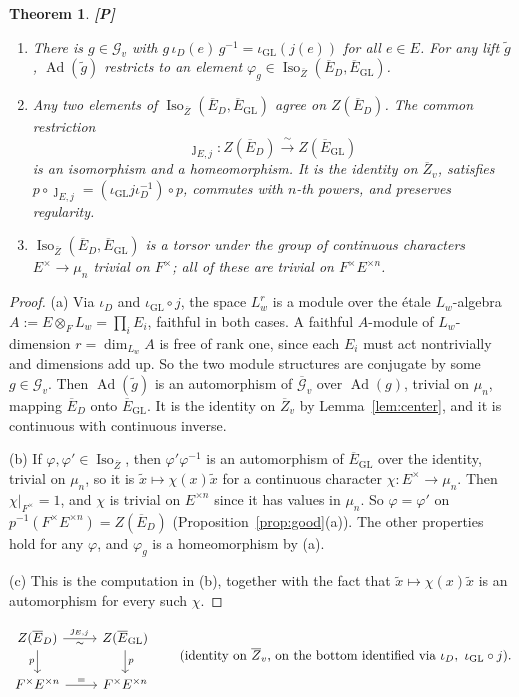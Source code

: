 \documentclass[12pt]{article}
\newcommand{\ov}[1]{\overline{#1}}
\newcommand{\Ad}{\operatorname{Ad}}
\newcommand{\Iso}{\operatorname{Iso}}
\newcommand{\GL}{\mathrm{GL}}
\newcommand{\Zb}{\ov{Z}}
\newcommand{\Eb}{\ov{E}}
\newcommand{\cG}{\mathcal{G}}
\newcommand{\cGb}{\ov{\mathcal{G}}}
\newcommand{\iD}{\iota_D}
\newcommand{\iG}{\iota_{\GL}}
\newcommand{\jj}{\jmath}
\newcommand{\Pv}{\textbf{[P]}}
\theoremstyle{plain}
\newtheorem{theorem}{Theorem}[section]
\theoremstyle{definition}
\begin{document}
\begin{theorem}\label{thm:ident}\Pv
\begin{enumerate}[label=(\alph*)]
\item There is $g\in\cG_v$ with $g\,\iD(e)\,g^{-1}=\iG(j(e))$ for all $e\in E$. For any lift $\tilde g$, $\Ad(\tilde g)$ restricts to an element $\varphi_g\in\Iso_{\Zb}(\Eb_D,\Eb_{\GL})$.
\item Any two elements of $\Iso_{\Zb}(\Eb_D,\Eb_{\GL})$ agree on $Z(\Eb_D)$. The common restriction
\[ \jj_{E,j}:Z(\Eb_D)\xrightarrow{\ \sim\ }Z(\Eb_{\GL}) \]
is an isomorphism and a homeomorphism. It is the identity on $\Zb_v$, satisfies $p\circ\jj_{E,j}=(\iG j\iD^{-1})\circ p$, commutes with $n$-th powers, and preserves regularity.
\item $\Iso_{\Zb}(\Eb_D,\Eb_{\GL})$ is a torsor under the group of continuous characters $E^\times\to\mu_n$ trivial on $F^\times$; all of these are trivial on $F^\times E^{\times n}$.
\end{enumerate}
\end{theorem}

\begin{proof}
(a) Via $\iD$ and $\iG\circ j$, the space $L_w^r$ is a module over the \'etale $L_w$-algebra $A:=E\otimes_FL_w=\prod_iE_i$, faithful in both cases. A faithful $A$-module of $L_w$-dimension $r=\dim_{L_w}A$ is free of rank one, since each $E_i$ must act nontrivially and dimensions add up. So the two module structures are conjugate by some $g\in\cG_v$. Then $\Ad(\tilde g)$ is an automorphism of $\cGb_v$ over $\Ad(g)$, trivial on $\mu_n$, mapping $\Eb_D$ onto $\Eb_{\GL}$. It is the identity on $\Zb_v$ by Lemma~\ref{lem:center}, and it is continuous with continuous inverse.

(b) If $\varphi,\varphi'\in\Iso_{\Zb}$, then $\varphi'\varphi^{-1}$ is an automorphism of $\Eb_{\GL}$ over the identity, trivial on $\mu_n$, so it is $\tilde x\mapsto\chi(x)\tilde x$ for a continuous character $\chi:E^\times\to\mu_n$. Then $\chi|_{F^\times}=1$, and $\chi$ is trivial on $E^{\times n}$ since it has values in $\mu_n$. So $\varphi=\varphi'$ on $p^{-1}(F^\times E^{\times n})=Z(\Eb_D)$ (Proposition~\ref{prop:good}(a)). The other properties hold for any $\varphi$, and $\varphi_g$ is a homeomorphism by (a).

(c) This is the computation in (b), together with the fact that $\tilde x\mapsto\chi(x)\tilde x$ is an automorphism for every such $\chi$.
\end{proof}

\begin{equation}\label{eq:toridiagram}
\begin{tikzcd}
Z(\Eb_D)\arrow[r,"\jj_{E,j}","\sim"']\arrow[d,"p"'] & Z(\Eb_{\GL})\arrow[d,"p"]\\
F^\times E^{\times n}\arrow[r,"="] & F^\times E^{\times n}
\end{tikzcd}
\qquad\text{(identity on }\Zb_v\text{, on the bottom identified via }\iD,\ \iG\circ j).
\end{equation}
\end{document}
